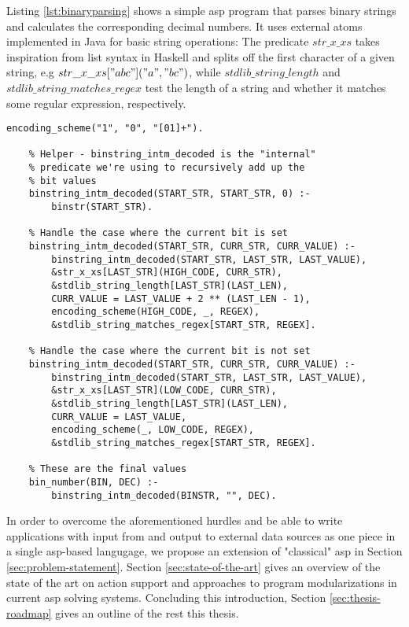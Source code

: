 \begin{example}
\label{ex:asp-binary-parsing}
Listing \ref{lst:binaryparsing} shows a simple \gls{asp} program that parses binary strings and calculates the corresponding decimal numbers. It uses external atoms implemented in Java for basic string operations: The predicate $str\_x\_xs$ takes inspiration from list syntax in Haskell and splits off the first character of a given string, e.g $str\_x\_xs["abc"]("a", "bc")$, while $stdlib\_string\_length$ and $stdlib\_string\_matches\_regex$ test the length of a string and whether it matches some regular expression, respectively. 
\begin{lstlisting}[style=asp-code, caption=Parsing binary strings in ASP, label={lst:binaryparsing}]
    encoding_scheme("1", "0", "[01]+").

    % Helper - binstring_intm_decoded is the "internal" 
    % predicate we're using to recursively add up the 
    % bit values
    binstring_intm_decoded(START_STR, START_STR, 0) :- 
        binstr(START_STR). 
    
    % Handle the case where the current bit is set
    binstring_intm_decoded(START_STR, CURR_STR, CURR_VALUE) :- 
        binstring_intm_decoded(START_STR, LAST_STR, LAST_VALUE),
        &str_x_xs[LAST_STR](HIGH_CODE, CURR_STR),
        &stdlib_string_length[LAST_STR](LAST_LEN),
        CURR_VALUE = LAST_VALUE + 2 ** (LAST_LEN - 1),
        encoding_scheme(HIGH_CODE, _, REGEX),
        &stdlib_string_matches_regex[START_STR, REGEX].
    
    % Handle the case where the current bit is not set
    binstring_intm_decoded(START_STR, CURR_STR, CURR_VALUE) :- 
        binstring_intm_decoded(START_STR, LAST_STR, LAST_VALUE),
        &str_x_xs[LAST_STR](LOW_CODE, CURR_STR),
        &stdlib_string_length[LAST_STR](LAST_LEN),
        CURR_VALUE = LAST_VALUE,
        encoding_scheme(_, LOW_CODE, REGEX),
        &stdlib_string_matches_regex[START_STR, REGEX].
    
    % These are the final values
    bin_number(BIN, DEC) :- 
        binstring_intm_decoded(BINSTR, "", DEC).    
\end{lstlisting}
\end{example}    

In order to overcome the aforementioned hurdles and be able to write applications with input from and output to external data sources as one piece in a single \gls{asp}-based langugage, we propose an extension of "classical" \gls{asp} in Section \ref{sec:problem-statement}. Section \ref{sec:state-of-the-art} gives an overview of the state of the art on action support and approaches to program modularizations in current \gls{asp} solving systems. Concluding this introduction, Section \ref{sec:thesis-roadmap} gives an outline of the rest this thesis.

